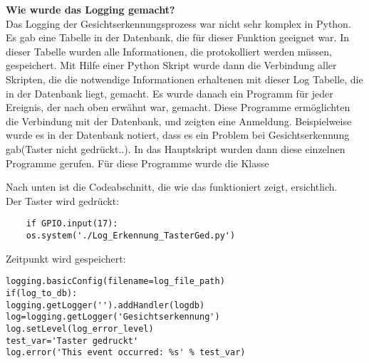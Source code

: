 \textbf{Wie wurde das Logging gemacht?}\\
Das Logging der Gesichtserkennungsprozess war nicht sehr komplex in Python. Es gab eine Tabelle in der Datenbank, die für dieser Funktion geeignet war. In dieser Tabelle wurden alle Informationen, die protokolliert werden müssen, gespeichert. Mit Hilfe einer Python Skript wurde dann die Verbindung aller Skripten, die die notwendige Informationen erhaltenen mit dieser Log Tabelle, die in der Datenbank liegt, gemacht. Es wurde danach ein Programm für jeder Ereignis, der nach oben erwähnt war, gemacht. Diese Programme ermöglichten die Verbindung mit der Datenbank, und zeigten eine Anmeldung. Beispielweise wurde es in der Datenbank notiert, dass es ein Problem bei Gesichtserkennung gab(Taster nicht gedrückt..). In das Hauptskript wurden dann diese einzelnen Programme gerufen. Für diese Programme wurde die Klasse %

Nach unten ist die Codeabschnitt, die wie das funktioniert zeigt, ersichtlich.\\

Der Taster wird gedrückt: \\

\begin{lstlisting}
	if GPIO.input(17):
	os.system('./Log_Erkennung_TasterGed.py')
\end{lstlisting}

Zeitpunkt wird gespeichert: \\

\begin{lstlisting}
logging.basicConfig(filename=log_file_path)
if(log_to_db):
logging.getLogger('').addHandler(logdb)
log=logging.getLogger('Gesichtserkennung')
log.setLevel(log_error_level)
test_var='Taster gedruckt'
log.error('This event occurred: %s' % test_var)
\end{lstlisting}

